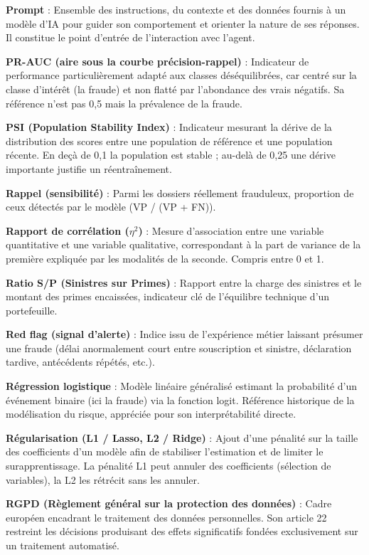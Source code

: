 \textbf{Prompt} : Ensemble des instructions, du contexte et des données fournis à un modèle d'IA pour guider son comportement et orienter la nature de ses réponses. Il constitue le point d'entrée de l'interaction avec l'agent.

\textbf{PR-AUC (aire sous la courbe précision-rappel)} : Indicateur de performance particulièrement adapté aux classes déséquilibrées, car centré sur la classe d'intérêt (la fraude) et non flatté par l'abondance des vrais négatifs. Sa référence n'est pas 0,5 mais la prévalence de la fraude.

\textbf{PSI (Population Stability Index)} : Indicateur mesurant la dérive de la distribution des scores entre une population de référence et une population récente. En deçà de 0,1 la population est stable ; au-delà de 0,25 une dérive importante justifie un réentraînement.

\textbf{Rappel (sensibilité)} : Parmi les dossiers réellement frauduleux, proportion de ceux détectés par le modèle (VP / (VP + FN)).

\textbf{Rapport de corrélation ($\eta^2$)} : Mesure d'association entre une variable quantitative et une variable qualitative, correspondant à la part de variance de la première expliquée par les modalités de la seconde. Compris entre 0 et 1.

\textbf{Ratio S/P (Sinistres sur Primes)} : Rapport entre la charge des sinistres et le montant des primes encaissées, indicateur clé de l'équilibre technique d'un portefeuille.

\textbf{Red flag (signal d'alerte)} : Indice issu de l'expérience métier laissant présumer une fraude (délai anormalement court entre souscription et sinistre, déclaration tardive, antécédents répétés, etc.).

\textbf{Régression logistique} : Modèle linéaire généralisé estimant la probabilité d'un événement binaire (ici la fraude) via la fonction logit. Référence historique de la modélisation du risque, appréciée pour son interprétabilité directe.

\textbf{Régularisation (L1 / Lasso, L2 / Ridge)} : Ajout d'une pénalité sur la taille des coefficients d'un modèle afin de stabiliser l'estimation et de limiter le surapprentissage. La pénalité L1 peut annuler des coefficients (sélection de variables), la L2 les rétrécit sans les annuler.

\textbf{RGPD (Règlement général sur la protection des données)} : Cadre européen encadrant le traitement des données personnelles. Son article 22 restreint les décisions produisant des effets significatifs fondées exclusivement sur un traitement automatisé.

